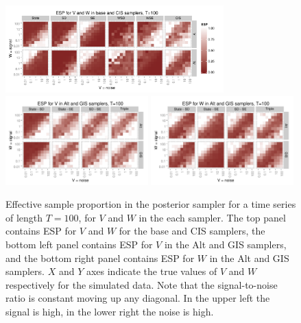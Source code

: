 \documentclass{article}
\begin{document}
\begin{figure}[!h]
\centering
\includegraphics[width=0.75\textwidth]{basecisESplot100}
\includegraphics[width=0.49\textwidth]{altintESplotV100}
\includegraphics[width=0.49\textwidth]{altintESplotW100}
\caption{Effective sample proportion in the posterior sampler for a time series of length $T=100$, for $V$ and $W$ in the each sampler. The top panel contains ESP for $V$ and $W$ for the base and CIS samplers, the bottom left panel contains ESP for $V$ in the Alt and GIS samplers, and the bottom right panel contains ESP for $W$ in the Alt and GIS samplers. $X$ and $Y$ axes indicate the true values of $V$ and $W$ respectively for the simulated data. Note that the signal-to-noise ratio is constant moving up any diagonal. In the upper left the signal is high, in the lower right the noise is high.}
\label{ESplot2}
\end{figure}
\end{document}
